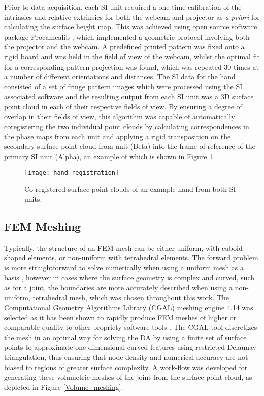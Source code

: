 \documentclass[twoside]{bhamthesis}
\theoremstyle{definition}
\begin{document}
Prior to data acquisition, each SI unit required a one-time calibration of the intrinsics and relative extrinsics for both the webcam and projector as \textit{a priori} for calculating the surface height map. This was achieved using open source software package Procamcalib \cite{audet2009user}, which implemented a geometric protocol involving both the projector and the webcam.  A predefined printed pattern was fixed onto a rigid board and was held in the field of view of the webcam, whilst the optimal fit for a corresponding pattern projection was found, which was repeated 30 times at a number of different orientations and distances. The SI data for the hand consisted of a set of fringe pattern images which were processed using the SI associated software \cite{basevi2013simultaneous} and the resulting output from each SI unit was a 3D surface point cloud in each of their respective fields of view. By ensuring a degree of overlap in their fields of view, this algorithm was capable of automatically coregistering the two individual point clouds by calculating correspondences in the phase maps from each unit and applying a rigid transposition on the secondary surface point cloud from unit (Beta) into the frame of reference of the primary SI unit (Alpha), an example of which is shown in Figure \ref{fig:registered}.

\begin{figure}[!ht]
\texttt{[image: hand\_registration]}
\centering
\caption{Co-registered surface point clouds of an example hand from both SI units.}
\centering
\label{fig:registered}
\end{figure}

\subsection{FEM Meshing}

Typically, the structure of an FEM mesh can be either uniform, with cuboid shaped elements, or non-uniform with tetrahedral elements. The forward problem is more straightforward to solve numerically when using a uniform mesh as a basis \cite{montejo2014computational}, however in cases where the surface geometry is complex and curved, such as for a joint, the boundaries are more accurately described when using a non-uniform, tetrahedral mesh, which was chosen throughout this work. The Computational Geometry Algorithms Library (CGAL) meshing engine 4.14 \cite{cgal:eb-18a} was selected as it has been shown to rapidly produce FEM meshes of higher or comparable quality to other propriety software tools \cite{jermyn2013fast}. The CGAL tool discretizes the mesh in an optimal way for solving the DA by using a finite set of surface points to approximate one-dimensional curved features using restricted Delaunay triangulation, thus ensuring that node density and numerical accuracy are not biased to regions of greater surface complexity.  A work-flow was developed for generating these volumetric meshes of the joint from the surface point cloud, as depicted in Figure \ref{Volume_meshing}.
\end{document}
